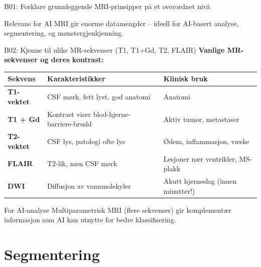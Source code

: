 \documentclass[aspectratio=169, 10pt]{beamer}
\begin{document}
\begin{frame}{B01: Forklare grunnleggende MRI-prinsipper på et overordnet nivå}
    \begin{block}{Relevans for AI}
        MRI gir enorme datamengder -- ideell for AI-basert analyse, segmentering, og mønstergjenkjenning.
    \end{block}
\end{frame}

\begin{frame}{B02: Kjenne til ulike MR-sekvenser (T1, T1+Gd, T2, FLAIR)}
    \textbf{Vanlige MR-sekvenser og deres kontrast:}

    \vspace{0.2cm}
    \begin{center}
        \footnotesize
        \begin{tabular}{lp{4cm}p{4.5cm}}
            \toprule
            \textbf{Sekvens} & \textbf{Karakteristikker} & \textbf{Klinisk bruk} \\
            \midrule
            \textbf{T1-vektet} & CSF mørk, fett lyst, god anatomi & Anatomi \\
            \addlinespace
            \textbf{T1 + Gd} & Kontrast viser blod-hjerne-barriere-brudd & Aktiv tumor, metastaser \\
            \addlinespace
            \textbf{T2-vektet} & CSF lys, patologi ofte lys & Ødem, inflammasjon, væske \\
            \addlinespace
            \textbf{FLAIR} & T2-lik, men CSF mørk & Lesjoner nær ventrikler, MS-plakk \\
            \addlinespace
            \textbf{DWI} & Diffusjon av vannmolekyler & Akutt hjerneslag (innen minutter!) \\
            \bottomrule
        \end{tabular}
    \end{center}

    \vspace{0.2cm}
    \begin{alertblock}{\footnotesize For AI-analyse}
        \footnotesize Multiparametrisk MRI (flere sekvenser) gir komplementær informasjon som AI kan utnytte for bedre klassifisering.
    \end{alertblock}
\end{frame}

\section{Segmentering}
\end{document}
